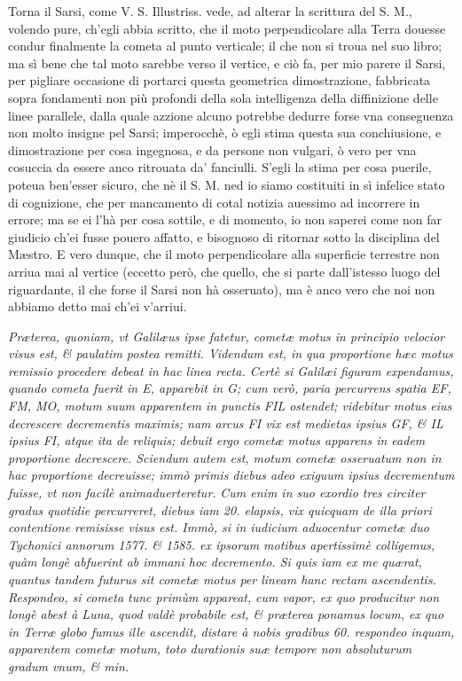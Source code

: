 \documentclass[11pt,twoside,openany]{book}
\begin{document}
Torna il Sarsi, come V. S. Illustriss. vede, ad alterar la scrittura del S. M., volendo pure, ch'egli abbia scritto, che il moto perpendicolare alla Terra douesse condur finalmente la cometa al punto verticale; il che non si troua nel suo libro; ma sì bene che tal moto sarebbe verso il vertice, e ciò fa, per mio parere il Sarsi, per pigliare occasione di portarci questa geometrica dimostrazione, fabbricata sopra fondamenti non più profondi della sola intelligenza della diffinizione delle linee parallele, dalla quale azzione alcuno potrebbe dedurre forse vna conseguenza non molto insigne pel Sarsi; imperocchè, ò egli stima questa sua conchiusione, e dimostrazione per cosa ingegnosa, e da persone non vulgari, ò vero per vna cosuccia da essere anco ritrouata da' fanciulli. S'egli la stima per cosa puerile, poteua ben'esser sicuro, che nè il S. M. ned io siamo costituiti in sì infelice stato di cognizione, che per mancamento di cotal notizia auessimo ad incorrere in errore; ma se ei l'hà per cosa sottile, e di momento, io non saperei come non far giudicio ch'ei fusse pouero affatto, e bisognoso di ritornar sotto la disciplina del Mæstro. E vero dunque, che il moto perpendicolare alla superficie terrestre non arriua mai al vertice (eccetto però, che quello, che si parte dall'istesso luogo del riguardante, il che forse il Sarsi non hà osseruato), ma è anco vero che noi non abbiamo detto mai ch'ei v'arriui.



\par\bigskip\noindent{}\enspace \textit{Præterea, quoniam, vt Galilæus ipse fatetur, cometæ motus in principio velocior visus est, \& paulatim postea remitti. Videndum est, in qua proportione hæc motus remissio procedere debeat in hac linea recta. Certè si Galilæi figuram expendamus, quando cometa fuerit in E, apparebit in G; cum verò, paria percurrens spatia EF, FM, MO, motum suum apparentem in punctis F}\textit{I}\textit{L ostendet; videbitur motus eius decrescere decrementis maximis; nam arcus FI vix est medietas ipsius GF, \& IL ipsius FI, atque ita de reliquis; debuit ergo cometæ motus apparens in eadem proportione decrescere. Sciendum autem est, motum cometæ osseruatum non in hac proportione decreuisse; immò primis diebus adeo exiguum ipsius decrementum fuisse, vt non facilè animaduerteretur. }\textit{Cum enim in suo exordio tres circiter gradus quotidie percurreret, diebus iam 20. elapsis, vix quicquam de illa priori contentione remisisse visus est. Immò, si in iudicium aduocentur cometæ duo Tychonici annorum 1577. \& 1585. ex ipsorum motibus apertissimè colligemus, quàm longè abfuerint ab immani hoc decremento. Si quis iam ex me quærat, quantus tandem futurus sit cometæ motus per lineam hanc rectam ascendentis. Respondeo, si cometa tunc primùm appareat, }\textit{cum vapor, ex quo producitur non longè abest à Luna, quod valdè probabile est, \& præterea ponamus locum, ex quo in Terræ globo fumus ille ascendit, distare à nobis gradibus 60. respondeo inquam, apparentem cometæ motum, toto durationis suæ tempore non absoluturum gradum vnum, \& min.}
\end{document}
